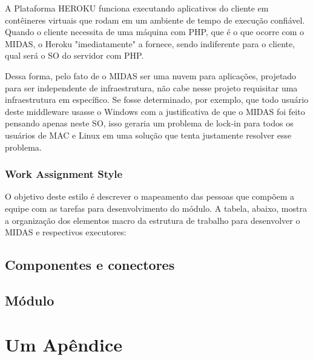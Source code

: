 \documentclass[11pt,a4paper]{article}
\begin{document}
A Plataforma HEROKU funciona executando aplicativos do cliente em contêineres virtuais que rodam em um ambiente de tempo de execução confiável. Quando o cliente necessita de uma máquina com PHP, que é o que ocorre com o MIDAS, o Heroku "imediatamente" a fornece, sendo indiferente para o cliente, qual será o SO do servidor com PHP.

Dessa forma, pelo fato de o MIDAS ser uma nuvem para aplicações, projetado para ser independente de infraestrutura, não cabe nesse projeto requisitar uma infraestrutura em específico. Se fosse determinado, por exemplo, que todo usuário deste middleware usasse o Windows com a justificativa de que o MIDAS foi feito pensando apenas neste SO, isso geraria um problema de lock-in para todos os usuários de MAC e Linux em uma solução que tenta justamente resolver esse problema.

\subsubsection*{Work Assignment Style}

O objetivo deste estilo é descrever o mapeamento das pessoas que compõem a equipe com as tarefas para desenvolvimento do módulo. A tabela, abaixo, mostra a organização dos elementos macro da estrutura de trabalho para desenvolver o MIDAS e respectivos executores:


\subsection{Componentes e conectores}


\subsection{Módulo}





\appendix %
\newpage
\section{Um Ap\^{e}ndice}
\end{document}

